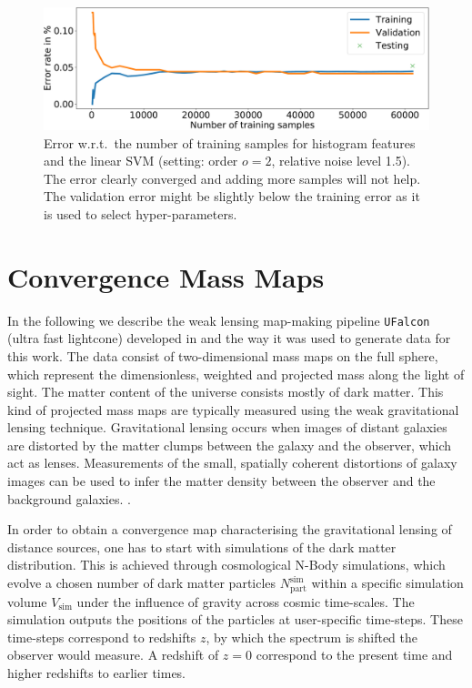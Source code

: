 \documentclass[final,twocolumn,3p,times,sort&compress]{elsarticle}
\newcommand{\1}{\b{1}}              %
\newcommand{\0}{\b{0}}              %
\newcommand{\pkg}[1]{\texttt{#1}}
\begin{document}
\begin{figure}[ht!]
	\centering
	\includegraphics[width=\linewidth]{hist_error_order2_noise1_5}
	\caption{Error w.r.t.\ the number of training samples for histogram features and the linear SVM (setting: order $o=2$, relative noise level 1.5). The error clearly converged and adding more samples will not help. The validation error might be slightly below the training error as it is used to select hyper-parameters.}
	\label{fig:hist_error_evolution}
\end{figure}

\section{Convergence Mass Maps}
\label{sec:convergence_mass_maps}

In the following we describe the weak lensing map-making pipeline \pkg{UFalcon} (ultra fast lightcone) developed in \citep{sgier2018fastgeneration} and the way it was used to generate data for this work.
The data consist of two-dimensional mass maps on the full sphere, which represent the dimensionless, weighted and projected mass along the light of sight.
The matter content of the universe consists mostly of dark matter.
This kind of projected mass maps are typically measured using the weak gravitational lensing technique.
Gravitational lensing occurs when images of distant galaxies are distorted by the matter clumps between the galaxy and the observer, which act as lenses.
Measurements of the small, spatially coherent distortions of galaxy images can be used to infer the matter density between the observer and the background galaxies.
\citep[see][for a review of gravitational lensing]{bartelman2010gravitationallensing}.

In order to obtain a convergence map characterising the gravitational lensing of distance sources, one has to start with simulations of the dark matter distribution.
This is achieved through cosmological N-Body simulations, which evolve a chosen number of dark matter particles $N_\mathrm{part}^\mathrm{sim}$ within a specific simulation volume $V_\mathrm{sim}$ under the influence of gravity across cosmic time-scales. The simulation outputs the positions of the particles at user-specific time-steps. These time-steps correspond to redshifts $z$, by which the spectrum is shifted the observer would measure. A redshift of $z=0$ correspond to the present time and higher redshifts to earlier times.
\end{document}
